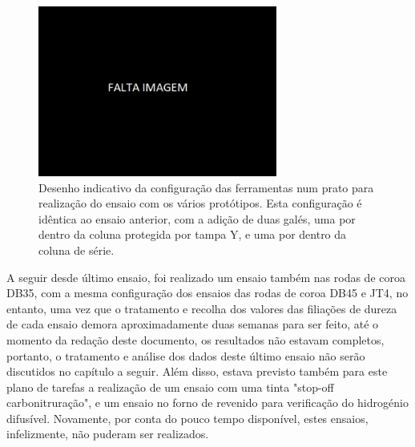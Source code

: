 \begin{figure}[htb!]
    \centering
    \includegraphics[width = 0.7\textwidth]{Figures/Cap3/Falta_Imagem.png}
    \caption[Desenho com a configuração do ensaio das galés]%
    {Desenho indicativo da configuração das ferramentas num prato para realização do ensaio com os vários protótipos. Esta configuração é idêntica ao ensaio anterior, com a adição de duas galés, uma por dentro da coluna protegida por tampa Y, e uma por dentro da coluna de série.}
    \label{fig:gales}
\end{figure}
\par
A seguir desde último ensaio, foi realizado um ensaio também nas rodas de coroa DB35, com a mesma configuração dos ensaios das rodas de coroa DB45 e JT4, no entanto, uma vez que o tratamento e recolha dos valores das filiações de dureza de cada ensaio demora aproximadamente duas semanas para ser feito, até o momento da redação deste documento, os resultados não estavam completos, portanto, o tratamento e análise dos dados deste último ensaio não serão discutidos no capítulo a seguir. Além disso, estava previsto também para este plano de tarefas a realização de um ensaio com uma tinta "stop-off carbonitruração", e um ensaio no forno de revenido para verificação do hidrogénio difusível. Novamente, por conta do pouco tempo disponível, estes ensaios, infelizmente, não puderam ser realizados.